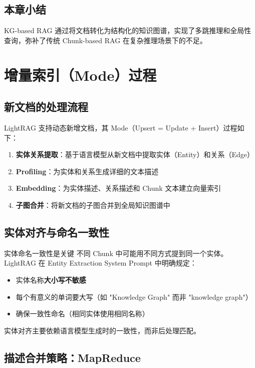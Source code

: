 \documentclass[a4paper]{article}
\begin{document}
\subsection{本章小结}

KG-based RAG 通过将文档转化为结构化的知识图谱，实现了多跳推理和全局性查询，弥补了传统 Chunk-based RAG 在复杂推理场景下的不足。


\section{增量索引（Mode）过程}

\subsection{新文档的处理流程}

LightRAG 支持动态新增文档，其 Mode（Upsert = Update + Insert）过程如下：

\begin{enumerate}
    \item \textbf{实体关系提取}：基于语言模型从新文档中提取实体（Entity）和关系（Edge）
    \item \textbf{Profiling}：为实体和关系生成详细的文本描述
    \item \textbf{Embedding}：为实体描述、关系描述和 Chunk 文本建立向量索引
    \item \textbf{子图合并}：将新文档的子图合并到全局知识图谱中
\end{enumerate}

\subsection{实体对齐与命名一致性}

\begin{warningbox}{实体命名一致性是关键}
不同 Chunk 中可能用不同方式提到同一个实体。LightRAG 在 Entity Extraction System Prompt 中明确规定：
\begin{itemize}
    \item 实体名称\textbf{大小写不敏感}
    \item 每个有意义的单词要大写（如 "Knowledge Graph" 而非 "knowledge graph"）
    \item 确保一致性命名（相同实体使用相同名称）
\end{itemize}
实体对齐主要依赖语言模型生成时的一致性，而非后处理匹配。
\end{warningbox}

\subsection{描述合并策略：MapReduce}
\end{document}
